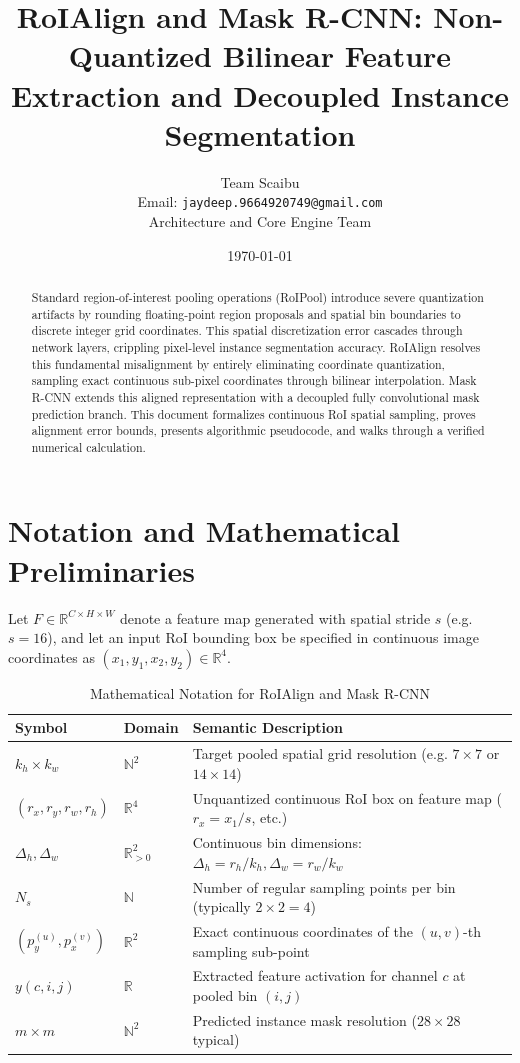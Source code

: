 \documentclass[11pt,a4paper]{article}
\title{RoIAlign and Mask R-CNN: Non-Quantized Bilinear Feature Extraction and Decoupled Instance Segmentation}
\author{Team Scaibu \\ \small Email: \texttt{jaydeep.9664920749@gmail.com} \\ \small Architecture and Core Engine Team}
\date{\today}
\theoremstyle{definition}
\begin{document}
\maketitle

\begin{abstract}
Standard region-of-interest pooling operations (RoIPool) introduce severe quantization artifacts by rounding floating-point region proposals and spatial bin boundaries to discrete integer grid coordinates. This spatial discretization error cascades through network layers, crippling pixel-level instance segmentation accuracy. RoIAlign resolves this fundamental misalignment by entirely eliminating coordinate quantization, sampling exact continuous sub-pixel coordinates through bilinear interpolation. Mask R-CNN extends this aligned representation with a decoupled fully convolutional mask prediction branch. This document formalizes continuous RoI spatial sampling, proves alignment error bounds, presents algorithmic pseudocode, and walks through a verified numerical calculation.
\end{abstract}

\section{Notation and Mathematical Preliminaries}

Let $F \in \mathbb{R}^{C \times H \times W}$ denote a feature map generated with spatial stride $s$ (e.g. $s = 16$), and let an input RoI bounding box be specified in continuous image coordinates as $(x_1, y_1, x_2, y_2) \in \mathbb{R}^4$.

\begin{table}[h]
\centering
\caption{Mathematical Notation for RoIAlign and Mask R-CNN}
\begin{tabular}{lll}
\toprule
\textbf{Symbol} & \textbf{Domain} & \textbf{Semantic Description} \\
\midrule
$k_h \times k_w$ & $\mathbb{N}^2$ & Target pooled spatial grid resolution (e.g. $7 \times 7$ or $14 \times 14$) \\
$(r_x, r_y, r_w, r_h)$ & $\mathbb{R}^4$ & Unquantized continuous RoI box on feature map ($r_x = x_1/s$, etc.) \\
$\Delta_h, \Delta_w$ & $\mathbb{R}_{> 0}^2$ & Continuous bin dimensions: $\Delta_h = r_h / k_h, \Delta_w = r_w / k_w$ \\
$N_s$ & $\mathbb{N}$ & Number of regular sampling points per bin (typically $2 \times 2 = 4$) \\
$(p_y^{(u)}, p_x^{(v)})$ & $\mathbb{R}^2$ & Exact continuous coordinates of the $(u, v)$-th sampling sub-point \\
$y(c, i, j)$ & $\mathbb{R}$ & Extracted feature activation for channel $c$ at pooled bin $(i, j)$ \\
$m \times m$ & $\mathbb{N}^2$ & Predicted instance mask resolution ($28 \times 28$ typical) \\
\bottomrule
\end{tabular}
\end{table}
\end{document}
